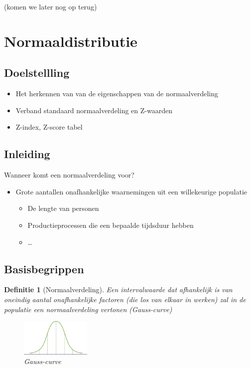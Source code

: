 \documentclass{article}
\newtheorem{theorem}{Definitie}[section]
\begin{document}
(komen we later nog op terug)

\section{Normaaldistributie}

\subsection{Doelstellling}

\begin{itemize}
    \item Het herkennen van van de eigenschappen van de normaalverdeling
    \item Verband standaard normaalverdeling en Z-waarden
    \item Z-index, Z-score tabel
\end{itemize}

\subsection{Inleiding}

Wanneer komt een normaalverdeling voor?

\begin{itemize}
    \item Grote aantallen onafhankelijke waarnemingen uit een willekeurige populatie
    \begin{itemize}
        \item De lengte van personen
        \item Productieprocessen die een bepaalde tijdsduur hebben
        \item \dots
    \end{itemize}
\end{itemize}

\subsection{Basisbegrippen}

\begin{theorem}[Normaalverdeling]
    Een intervalwaarde dat afhankelijk is van oneindig aantal onafhankelijke factoren (die los van elkaar in werken)
    zal in de populatie een normaalverdeling vertonen (Gauss-curve)

    \begin{figure}[H]
        \centering
        \includegraphics[width=0.3\textwidth]{gauss.png}
        \caption{Gauss-curve}
    \end{figure}
\end{theorem}
\end{document}
